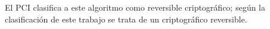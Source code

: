 


%
%
%

El PCI clasifica a este algoritmo como reversible criptográfico; según la
clasificación de este trabajo se trata de un criptográfico reversible.
